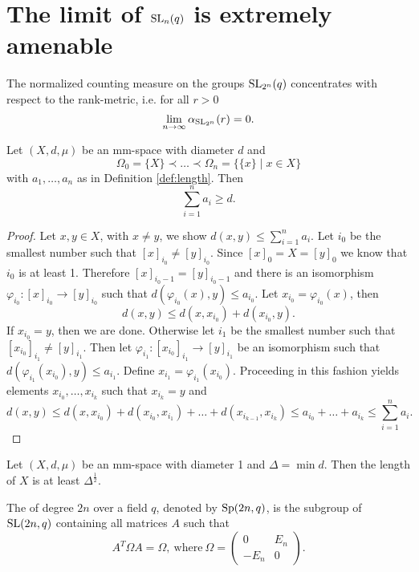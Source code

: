 \section{The limit of $\operatorname{SL}_n(q)$ is extremely amenable}
\begin{theorem}
The normalized counting measure on the groups $\operatorname{SL}_{2^n}(q)$ concentrates with respect to the rank-metric, i.e. for all $r>0$
\[\lim_{n\to\infty} \alpha_{\operatorname{SL}_{2^n}}(r)=0 .\]
\end{theorem}

\begin{lemma}
Let $(X,d,\mu)$ be an mm-space with diameter $d$ and 
\[\Omega_0=\{X\}\prec\dots\prec\Omega_n=\{\{x\}\mid x\in X\}\]
with $a_1,\dots,a_n$ as in Definition \ref{def:length}. Then 
\[\sum_{i=1}^{n}a_i\geq d.\]
\end{lemma}
\begin{proof}
Let $x,y\in X$, with $x\neq y$, we show $d(x,y)\leq\sum_{i=1}^{n}a_i$. Let $i_0$ be the smallest number such that $[x]_{i_0}\neq [y]_{i_0}$. Since $[x]_0=X=[y]_0$ we know that $i_0$ is at least 1. Therefore $[x]_{i_0-1}=[y]_{i_0-1}$ and there is an isomorphism $\varphi_{i_0}\colon[x]_{i_0}\to[y]_{i_0}$ such that $d(\varphi_{i_0}(x),y)\leq a_{i_0}$. Let $x_{i_0}=\varphi_{i_0}(x)$, then 
\[d(x,y)\leq d(x,x_{i_0})+d(x_{i_0},y).\]
If $x_{i_0}=y$, then we are done. Otherwise let $i_1$ be the smallest number such that $[x_{i_0}]_{i_1}\neq [y]_{i_1}$. Then let $\varphi_{i_1}\colon[x_{i_0}]_{i_1}\to[y]_{i_1}$ be an isomorphism such that $d(\varphi_{i_1}(x_{i_0}),y)\leq a_{i_1}$. Define $x_{i_1}=\varphi_{i_1}(x_{i_0})$. Proceeding in this fashion yields elements $x_{i_0},\dots,x_{i_k}$ such that $x_{i_k}=y$ and
\[d(x,y)\leq d(x,x_{i_0})+d(x_{i_0},x_{i_1})+\dots+d(x_{i_{k-1}},x_{i_k})\leq a_{i_0}+\dots +a_{i_k}\leq\sum_{i=1}^{n}a_i.\] 
\end{proof}


\begin{lemma}
Let $(X,d,\mu)$ be an mm-space with diameter 1 and $\Delta=\min d$. Then the length of $X$ is at least $\Delta^{\frac{1}{2}}$.
\end{lemma}

\begin{definition}
The  of degree $2n$ over a field $q$, denoted by $\operatorname{Sp}(2n,q)$, is the subgroup of $\operatorname{SL}(2n,q)$ containing all matrices $A$ such that
\[A^T\Omega A=\Omega,\ \text{where}\ \Omega=\left(\begin{array}{cc}
0&E_n\\
-E_n&0
\end{array}\right).\]
\end{definition}

